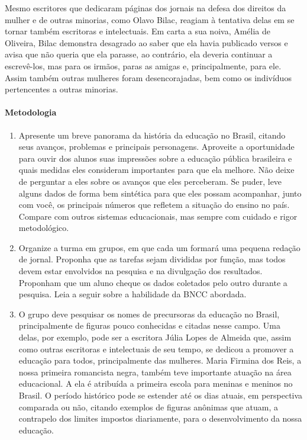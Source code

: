 \documentclass[12pt]{extarticle}
\begin{document}
Mesmo escritores que dedicaram páginas dos jornais na defesa dos
direitos da mulher e de outras minorias, como Olavo Bilac, reagiam à
tentativa delas em se tornar também escritoras e intelectuais. Em carta
a sua noiva, Amélia de Oliveira, Bilac demonstra desagrado ao saber que
ela havia publicado versos e avisa que não queria que ela parasse, ao
contrário, ela deveria continuar a escrevê-los, mas para os irmãos,
paras as amigas e, principalmente, para ele. Assim também outras
mulheres foram desencorajadas, bem como os indivíduos pertencentes a
outras minorias.

\paragraph{Metodologia}

\begin{enumerate}
\item
Apresente um breve panorama da história da
educação no Brasil, citando seus avanços, problemas e principais
personagens. Aproveite a oportunidade para ouvir dos alunos suas
impressões sobre a educação pública brasileira e quais medidas eles
consideram importantes para que ela melhore. Não deixe de perguntar a
eles sobre os avanços que eles perceberam. Se puder, leve alguns dados
de forma bem sintética para que eles possam acompanhar, junto com você,
os principais números que refletem a situação do ensino no país. Compare
com outros sistemas educacionais, mas sempre com cuidado e rigor
metodológico.

\item
Organize a turma em grupos, em que cada um formará uma pequena
redação de jornal. Proponha que as tarefas sejam divididas por função,
mas todos devem estar envolvidos na pesquisa e na divulgação dos
resultados. Proponham que um aluno cheque os dados coletados pelo outro
durante a pesquisa. 
Leia a seguir sobre a habilidade da BNCC abordada.



\item
O grupo deve pesquisar os nomes de precursoras da educação no Brasil,
principalmente de figuras pouco conhecidas e citadas nesse campo. Uma
delas, por exemplo, pode ser a escritora Júlia Lopes de Almeida que,
assim como outras escritoras e intelectuais de seu tempo, se dedicou a
promover a educação para todos, principalmente das mulheres. Maria
Firmina dos Reis, a nossa primeira romancista negra, também teve
importante atuação na área educacional. A ela é atribuída a primeira
escola para meninas e meninos no Brasil. O período histórico pode se
estender até os dias atuais, em perspectiva comparada ou não, citando
exemplos de figuras anônimas que atuam, a contrapelo dos limites
impostos diariamente, para o desenvolvimento da nossa educação.


\end{enumerate}
\end{document}
